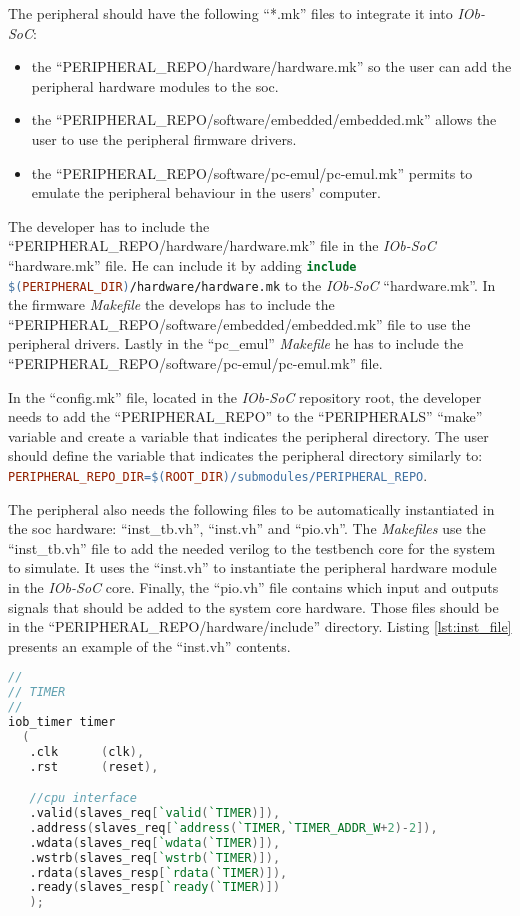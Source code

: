 The peripheral should have the following \enquote{*.mk} files to integrate it into \textit{IOb-SoC}:
\begin{itemize}
    \item the \enquote{PERIPHERAL_REPO/hardware/hardware.mk} so the user can add the peripheral hardware modules to the \acrshort{soc}.
    \item the \enquote{PERIPHERAL_REPO/software/embedded/embedded.mk} allows the user to use the peripheral firmware drivers.
    \item the \enquote{PERIPHERAL_REPO/software/pc-emul/pc-emul.mk} permits to emulate the peripheral behaviour in the users' computer.
\end{itemize}
The developer has to include the \enquote{PERIPHERAL_REPO/hardware/hardware.mk} file in the \textit{IOb-SoC} \enquote{hardware.mk} file. He can include it by adding \lstinline[language=make]{include $(PERIPHERAL_DIR)/hardware/hardware.mk} to the \textit{IOb-SoC} \enquote{hardware.mk}. In the firmware \textit{Makefile} the develops has to include the \enquote{PERIPHERAL_REPO/software/embedded/embedded.mk} file to use the peripheral drivers. Lastly in the \enquote{pc_emul} \textit{Makefile} he has to include the \enquote{PERIPHERAL_REPO/software/pc-emul/pc-emul.mk} file.

In the \enquote{config.mk} file, located in the \textit{IOb-SoC} repository root, the developer needs to add the \enquote{PERIPHERAL_REPO} to the \enquote{PERIPHERALS} \enquote{make} variable and create a variable that indicates the peripheral directory. The user should define the variable that indicates the peripheral directory similarly to: \lstinline[language=make]{PERIPHERAL_REPO_DIR=$(ROOT_DIR)/submodules/PERIPHERAL_REPO}.

The peripheral also needs the following files to be automatically instantiated in the \acrshort{soc} hardware: \enquote{inst_tb.vh}, \enquote{inst.vh} and \enquote{pio.vh}. The \textit{Makefiles} use the \enquote{inst_tb.vh} file to add the needed verilog to the testbench core for the system to simulate. It uses the \enquote{inst.vh} to instantiate the peripheral hardware module in the \textit{IOb-SoC} core. Finally, the \enquote{pio.vh} file contains which input and outputs signals that should be added to the system core hardware. Those files should be in the \enquote{PERIPHERAL_REPO/hardware/include} directory. Listing \ref{lst:inst_file} presents an example of the \enquote{inst.vh} contents.


\begin{lstlisting}[language=Verilog, caption={Example of the \enquote{inst.vh} file.}, label=lst:inst_file]
//
// TIMER
//
iob_timer timer
  (
   .clk      (clk),
   .rst      (reset),

   //cpu interface
   .valid(slaves_req[`valid(`TIMER)]),
   .address(slaves_req[`address(`TIMER,`TIMER_ADDR_W+2)-2]),
   .wdata(slaves_req[`wdata(`TIMER)]),
   .wstrb(slaves_req[`wstrb(`TIMER)]),
   .rdata(slaves_resp[`rdata(`TIMER)]),
   .ready(slaves_resp[`ready(`TIMER)])
   );
\end{lstlisting}

